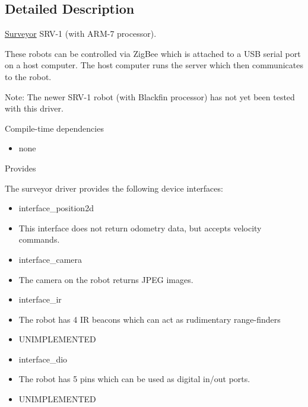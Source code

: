 \subsection{Detailed Description}
\hyperlink{classSurveyor}{Surveyor} SRV-1 (with ARM-7 processor). 

These robots can be controlled via ZigBee which is attached to a USB serial port on a host computer. The host computer runs the server which then communicates to the robot.

\begin{Desc}
\item[Note:]The newer SRV-1 robot (with Blackfin processor) has not yet been tested with this driver.\end{Desc}
\begin{Desc}
\item[Compile-time dependencies]\end{Desc}
\begin{itemize}
\item none\end{itemize}


\begin{Desc}
\item[Provides]\end{Desc}
The surveyor driver provides the following device interfaces:

\begin{itemize}
\item interface\_\-position2d\item This interface does not return odometry data, but accepts velocity commands.\end{itemize}


\begin{itemize}
\item interface\_\-camera\item The camera on the robot returns JPEG images.\end{itemize}


\begin{itemize}
\item interface\_\-ir\item The robot has 4 IR beacons which can act as rudimentary range-finders\item UNIMPLEMENTED\end{itemize}


\begin{itemize}
\item interface\_\-dio\item The robot has 5 pins which can be used as digital in/out ports.\item UNIMPLEMENTED\end{itemize}


